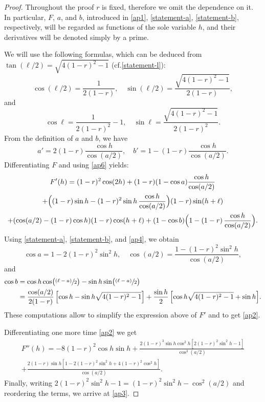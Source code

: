 \documentclass[11pt]{article}
\newcommand{\cf}{cf.\xspace}
\numberwithin{equation}{section}
\newcommand{\psfrac}[2]{\sfrac{(#1)}{#2}}
\theoremstyle{plain}
\theoremstyle{definition}
\begin{document}
\begin{proof}
Throughout the proof $r$ is fixed, therefore we omit the dependence on it. In particular, $F$, $a$, and $b$, introduced in \eqref{ap1}, \eqref{statement-a}, \eqref{statement-b}, respectively, will be regarded as functions of the sole variable $h$, and their derivatives will be denoted simply by a prime.

We will use the following formulas, which can be deduced from $\tan(\ell/2)=\sqrt{4(1-r)^2-1}$ (\cf \eqref{statement-l}):
\begin{equation}\label{ap4}
\cos(\ell/2)=\frac{1}{2(1-r)}, \quad \sin(\ell/2)=\frac{\sqrt{4(1-r)^2-1}}{2(1-r)},
\end{equation}
and
\begin{equation}\label{ap5}
\cos\ell=\frac{1}{2(1-r)^2} - 1,\quad \sin\ell=\frac{\sqrt{4(1-r)^2-1}}{2(1-r)^2}.
\end{equation}
From the definition of $a$ and $b$, we have
\begin{equation}\label{ap6}
a'=2(1-r) \frac{\cos h}{\cos(a/2)},\quad
b'=1 - (1-r) \frac{\cos h}{\cos(a/2)}.
\end{equation}
Differentiating $F$ and using \eqref{ap6} yields:
\begin{multline*}
F'(h)=(1-r)^2 \cos(2h) +(1-r) (1-\cos a)\frac{\cos h}{\cos(a/2)}\\
+\Bigl((1-r)\sin h-(1-r)^2 \sin h\, \frac{\cos h}{\cos(a/2)}\Bigr) (1-r) \sin(h+\ell)\\
+(\cos(a/2)-(1-r)\cos h) (1-r) \cos(h+\ell) +(1-\cos b) \Bigl(1-(1-r)\, \frac{\cos h}{\cos(a/2)}\Bigr).
\end{multline*}
Using \eqref{statement-a}, \eqref{statement-b}, and \eqref{ap4}, we obtain
\[
\cos a= 1- 2(1-r)^2\sin^2 h,\quad \cos(a/2)=\frac{1-(1-r)^2\sin^2 h}{\cos(a/2)},
\]
and
\begin{align*}
\cos b&=\cos h \cos\bigl(\psfrac{\ell-a}{2}\bigr)-\sin h \sin\bigl(\psfrac{\ell -a}{2}\bigr)\\
&=\frac{\cos(a/2)}{2(1-r)}\,\Bigl[\cos h-\sin h \sqrt{4(1-r)^2-1} \Bigr]+
\frac{\sin h}{2}\,\Bigl[\cos h \sqrt{4(1-r)^2-1}
+ \sin h\Bigr].
\end{align*}
These computations allow to simplify the expression above of $F'$ and to get \eqref{ap2}.

Differentiating one more time \eqref{ap2} we get
\begin{multline*}
F''(h)=-8 (1-r)^2 \cos h \sin h + \frac{2(1-r)^3 \sin h \cos^2 h \left[ 2(1-r)^2 \sin^2 h - 1\right]}{\cos^3(a/2)}
\\
+\frac{2 (1-r)\sin h\left[ 1-2(1-r)^2\sin^2 h + 4 (1-r)^2 \cos^2 h \right]}{\cos(a/2)}.
\end{multline*}
Finally, writing $2(1-r)^2\sin^2h - 1 = (1-r)^2\sin^2 h - \cos^2(a/2)$ and reordering the terms, we arrive at \eqref{ap3}.


\end{proof}
\end{document}
